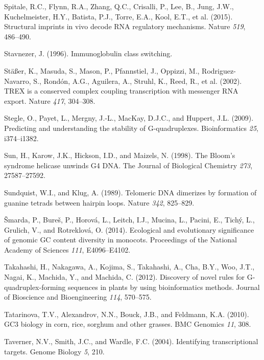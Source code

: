 \documentclass[12pt,a4paper,]{report}
\begin{document}
\leavevmode\hypertarget{ref-Spitale2015}{}%
Spitale, R.C., Flynn, R.A., Zhang, Q.C., Crisalli, P., Lee, B., Jung,
J.W., Kuchelmeister, H.Y., Batista, P.J., Torre, E.A., Kool, E.T., et
al. (2015). Structural imprints in vivo decode RNA regulatory
mechanisms. Nature \emph{519}, 486--490.

\leavevmode\hypertarget{ref-Stavnezer1996}{}%
Stavnezer, J. (1996). Immunoglobulin class switching.

\leavevmode\hypertarget{ref-Strauxdfer2002}{}%
Stäßer, K., Masuda, S., Mason, P., Pfannstiel, J., Oppizzi, M.,
Rodriguez-Navarro, S., Rondón, A.G., Aguilera, A., Struhl, K., Reed, R.,
et al. (2002). TREX is a conserved complex coupling transcription with
messenger RNA export. Nature \emph{417}, 304--308.

\leavevmode\hypertarget{ref-Stegle2009}{}%
Stegle, O., Payet, L., Mergny, J.-L., MacKay, D.J.C., and Huppert, J.L.
(2009). Predicting and understanding the stability of G-quadruplexes.
Bioinformatics \emph{25}, i374--i1382.

\leavevmode\hypertarget{ref-Sun1998}{}%
Sun, H., Karow, J.K., Hickson, I.D., and Maizels, N. (1998). The Bloom's
syndrome helicase unwinds G4 DNA. The Journal of Biological Chemistry
\emph{273}, 27587--27592.

\leavevmode\hypertarget{ref-Sundquist1989}{}%
Sundquist, W.I., and Klug, A. (1989). Telomeric DNA dimerizes by
formation of guanine tetrads between hairpin loops. Nature \emph{342},
825--829.

\leavevmode\hypertarget{ref-Smarda2014}{}%
Šmarda, P., Bureš, P., Horová, L., Leitch, I.J., Mucina, L., Pacini, E.,
Tichý, L., Grulich, V., and Rotreklová, O. (2014). Ecological and
evolutionary significance of genomic GC content diversity in monocots.
Proceedings of the National Academy of Sciences \emph{111},
E4096--E4102.

\leavevmode\hypertarget{ref-Takahashi2012}{}%
Takahashi, H., Nakagawa, A., Kojima, S., Takahashi, A., Cha, B.Y., Woo,
J.T., Nagai, K., Machida, Y., and Machida, C. (2012). Discovery of novel
rules for G-quadruplex-forming sequences in plants by using
bioinformatics methods. Journal of Bioscience and Bioengineering
\emph{114}, 570--575.

\leavevmode\hypertarget{ref-Tatarinova2010}{}%
Tatarinova, T.V., Alexandrov, N.N., Bouck, J.B., and Feldmann, K.A.
(2010). GC3 biology in corn, rice, sorghum and other grasses. BMC
Genomics \emph{11}, 308.

\leavevmode\hypertarget{ref-Taverner2004}{}%
Taverner, N.V., Smith, J.C., and Wardle, F.C. (2004). Identifying
transcriptional targets. Genome Biology \emph{5}, 210.
\end{document}
